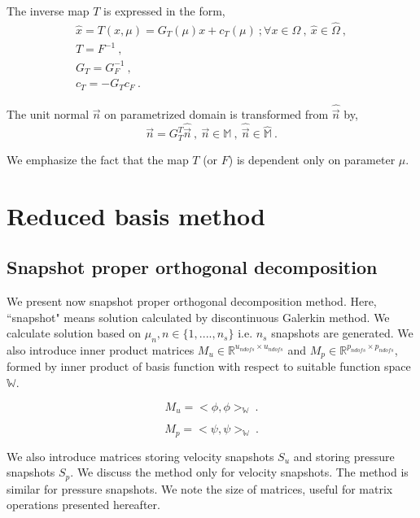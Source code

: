 \documentclass[graybox]{svmult}
\begin{document}
The inverse map $T$ is expressed in the form,
\begin{gather}\label{affine_T}
\hat{x} = T(x,\mu) = G_T(\mu)x + c_T(\mu) \ ; \forall x \in \Omega \ , \ \hat{x} \in \hat{\Omega} \ , \\
T = F^{-1} \ ,\\
G_T = G_F^{-1} \ , \\
c_T = -G_T c_F \ .
\end{gather}

The unit normal $\overrightarrow{n}$ on parametrized domain is transformed from $\hat{\overrightarrow{n}}$ by,
\begin{equation}
\overrightarrow{n} = G_T^T \hat{\overrightarrow{n}} \ , \ \overrightarrow{n} \in \mathbb{M} \ , \ \hat{\overrightarrow{n}} \in \hat{\mathbb{M}} \ .
\end{equation}

We emphasize the fact that the map $T$ (or $F$) is dependent only on parameter $\mu$. 

\section{Reduced basis method}

\subsection{Snapshot proper orthogonal decomposition}\label{POD_section}

We present now snapshot proper orthogonal decomposition method. Here, ``snapshot" means solution calculated by discontinuous Galerkin method. We calculate solution based on $\mu_n, n \in \lbrace 1,....,n_s \rbrace$ i.e. $n_s$ snapshots are generated. We also introduce inner product matrices $M_u \in \mathbb{R}^{u_{ndofs} \times u_{ndofs}}$ and $M_p \in \mathbb{R}^{p_{ndofs} \times p_{ndofs}}$, formed by inner product of basis function with respect to suitable function space $\mathbb{W}$.

\begin{equation}
M_u = <\phi,\phi>_{\mathbb{W}} \ .
\end{equation}

\begin{equation}
M_p = <\psi,\psi>_{\mathbb{W}} \ .
\end{equation}

We also introduce matrices storing velocity snapshots $S_u$ and storing pressure snapshots $S_p$. We discuss the method only for velocity snapshots. The method is similar for pressure snapshots. We note the size of matrices, useful for matrix operations presented hereafter.
\end{document}
